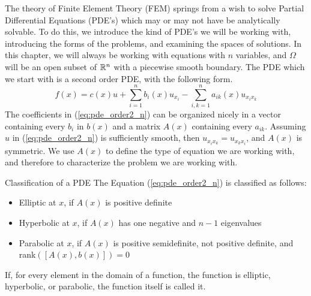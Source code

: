 The theory of Finite Element Theory (FEM) springs from a 
wish to solve Partial Differential Equations (PDE's) 
which may or may not have be analytically solvable. 
To do this, we introduce the kind of PDE's we will 
be working with, introducing the forms of the 
problems, and examining the spaces of solutions. 
In this chapter, we will always be working with 
equations with $n$ variables, and $\Omega$ will be 
an open subset of $\mathbb{R}^n$ with a piecewise smooth boundary.
The PDE which we start with is a second order PDE, 
with the following form.
\begin{equation}
	f(x) = c(x) u + \sum_{i=1}^{n}b_i(x)u_{x_{i}}
	- \sum_{i,k=1}^{n}a_{ik}(x)u_{x_ix_k}
	\label{eq:pde_order2_n}
\end{equation}
The coefficients in (\ref*{eq:pde_order2_n}) can be 
organized nicely in a vector containing every $b_i$ 
in $b(x)$
and a matrix $A(x)$ containing every $a_{ik}$.
Assuming $u$ in (\ref*{eq:pde_order2_n}) is sufficiently 
smooth, then $u_{x_ix_k} =u_{x_kx_i} $, and $A(x)$ is 
symmetric. 
We use $A(x)$ to define the type of equation we are working 
with, and therefore to characterize the problem we are 
working with.
\begin{defn}{Classification of a PDE}
	The Equation (\ref{eq:pde_order2_n}) is classified as follows:
	\begin{itemize}
		\item Elliptic at $x$, if $A(x)$ is positive definite
		\item Hyperbolic at $x$, if $A(x)$ has one negative and $n-1$ eigenvalues
		\item Parabolic at $x$, if $A(x)$ is positive semidefinite, not positive definite, and rank$([A(x), b(x)])=0$
	\end{itemize}

	If, for every element in the domain of a function, the function is elliptic, hyperbolic, or parabolic, the function itself is called it.
\end{defn}
